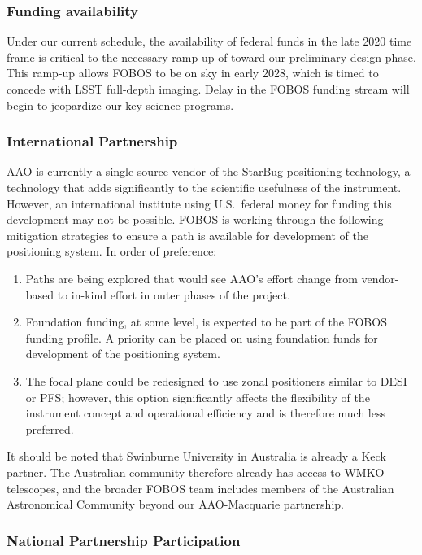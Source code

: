 \documentclass[oneside,11pt]{amsart}
\begin{document}
\subsubsection{Funding availability}

Under our current schedule, the availability of federal funds in the
late 2020 time frame is critical to the necessary ramp-up of toward
our preliminary design phase. This ramp-up allows FOBOS to be on sky
in early 2028, which is timed to concede with LSST full-depth
imaging. Delay in the FOBOS funding stream will begin to jeopardize
our key science programs.

\subsubsection{International Partnership}

AAO is currently a single-source vendor of the StarBug positioning
technology, a technology that adds significantly to the scientific
usefulness of the instrument. However, an international institute
using U.S.\ federal money for funding this development may not be possible.
FOBOS is working through the following mitigation strategies to
ensure a path is available for development of the positioning system.
In order of preference:

\begin{enumerate}
\item Paths are being explored that would see AAO's effort change
from vendor-based to in-kind effort in outer phases of the project.
\item Foundation funding, at some level, is expected to be part of
the FOBOS funding profile. A priority can be placed on using
foundation funds for development of the positioning system.
\item The focal plane could be redesigned to use zonal positioners
similar to DESI or PFS; however, this option significantly affects
the flexibility of the instrument concept and operational efficiency
and is therefore much less preferred.
\end{enumerate}

It should be noted that Swinburne University in Australia is already
a Keck partner. The Australian community therefore already has access
to WMKO telescopes, and the broader FOBOS team includes members of
the Australian Astronomical Community beyond our AAO-Macquarie
partnership.

\subsubsection{National Partnership Participation}
\end{document}
